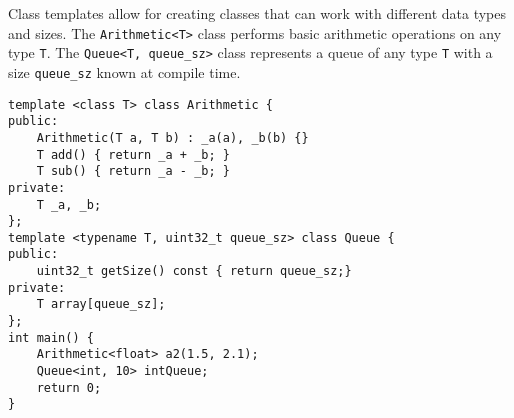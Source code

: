 Class templates allow for creating classes that can work with different data types and sizes.
The \texttt{Arithmetic<T>} class performs basic arithmetic operations on any type \texttt{T}. The
\texttt{Queue<T, queue\_sz>} class represents a queue of any type \texttt{T} with a size
\texttt{queue\_sz} known at compile time.
\begin{verbatim}
template <class T> class Arithmetic {
public:
    Arithmetic(T a, T b) : _a(a), _b(b) {}
    T add() { return _a + _b; }
    T sub() { return _a - _b; }
private:
    T _a, _b;
};
template <typename T, uint32_t queue_sz> class Queue {
public:
    uint32_t getSize() const { return queue_sz;}
private:
    T array[queue_sz];
};
int main() {
    Arithmetic<float> a2(1.5, 2.1);
    Queue<int, 10> intQueue;
    return 0;
}
\end{verbatim}